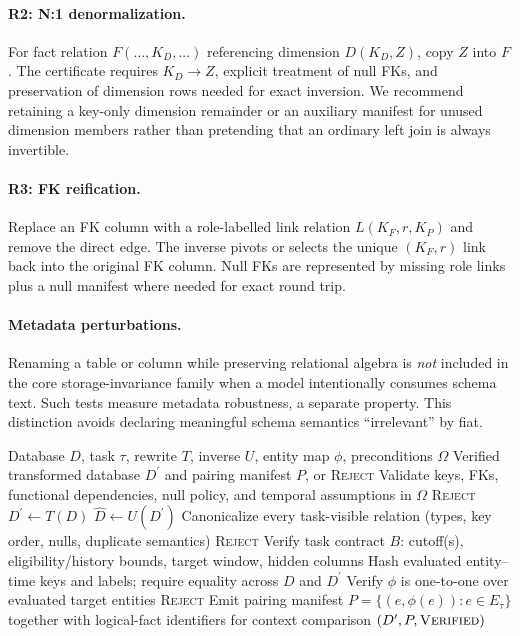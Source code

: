 \documentclass[runningheads]{llncs}
\newcommand{\task}{\tau}
\begin{document}
\paragraph{R2: N:1 denormalization.}
For fact relation $F(\ldots,K_D,\ldots)$ referencing dimension $D(K_D,Z)$, copy $Z$ into $F$. The certificate requires $K_D\rightarrow Z$, explicit treatment of null FKs, and preservation of dimension rows needed for exact inversion. We recommend retaining a key-only dimension remainder or an auxiliary manifest for unused dimension members rather than pretending that an ordinary left join is always invertible.

\paragraph{R3: FK reification.}
Replace an FK column with a role-labelled link relation $L(K_F,r,K_P)$ and remove the direct edge. The inverse pivots or selects the unique $(K_F,r)$ link back into the original FK column. Null FKs are represented by missing role links plus a null manifest where needed for exact round trip.

\paragraph{Metadata perturbations.}
Renaming a table or column while preserving relational algebra is \emph{not} included in the core storage-invariance family when a model intentionally consumes schema text. Such tests measure metadata robustness, a separate property. This distinction avoids declaring meaningful schema semantics ``irrelevant'' by fiat.

\begin{algorithm}[t]
\caption{Certificate verification and paired-entity manifest construction}
\label{alg:cert}
\begin{algorithmic}[1]
\Require Database $D$, task $\task$, rewrite $T$, inverse $U$, entity map $\phi$, preconditions $\Omega$
\Ensure Verified transformed database $D^{\prime}$ and pairing manifest $P$, or \textsc{Reject}
\State Validate keys, FKs, functional dependencies, null policy, and temporal assumptions in $\Omega$
 \State \Return \textsc{Reject} \EndIf
\State $D^{\prime}\gets T(D)$
\State $\widehat D\gets U(D^{\prime})$
\State Canonicalize every task-visible relation (types, key order, nulls, duplicate semantics)
\If{$\operatorname{hash}_{\task}(\widehat D)\neq\operatorname{hash}_{\task}(D)$}
    \State \Return \textsc{Reject}
\EndIf
\State Verify task contract $B$: cutoff(s), eligibility/history bounds, target window, hidden columns
\State Hash evaluated entity--time keys and labels; require equality across $D$ and $D^{\prime}$
\State Verify $\phi$ is one-to-one over evaluated target entities
 \State \Return \textsc{Reject} \EndIf
\State Emit pairing manifest $P=\{(e,\phi(e)):e\in E_{\task}\}$ together with logical-fact identifiers for context comparison
\State \Return $(D^{\prime},P,\textsc{Verified})$
\end{algorithmic}
\end{algorithm}
\end{document}
